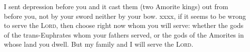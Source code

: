 \begin{inparaenum}
     I sent depression before you and it cast them (two Amorite kings) out from before you, not by your sword neither by your bow.%
     xxxx, if it seems to be wrong to serve the \textsc{Lord}, then choose right now whom you will serve: whether the gods of the trans-Euphrates whom your fathers served, or the gods of the Amorites in whose land you dwell. But my family and I will serve the \textsc{Lord}.%
    
    
    
    
\end{inparaenum}
